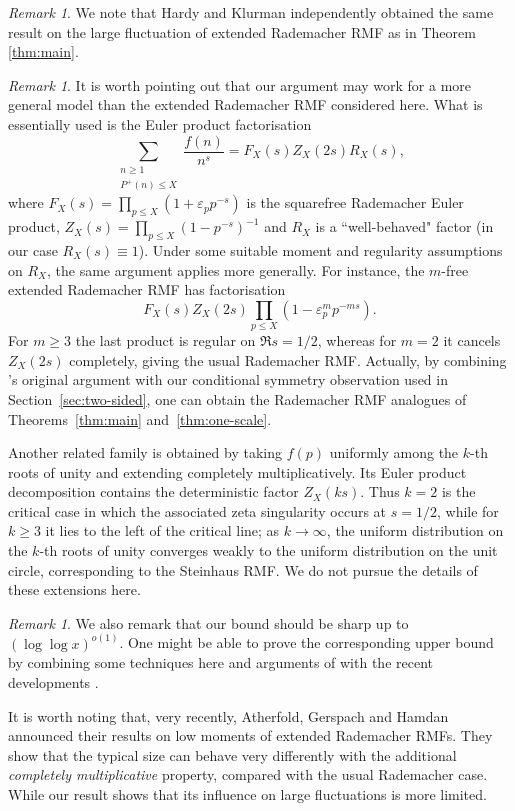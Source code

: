 \documentclass[a4paper,12pt,reqno]{amsart}
\numberwithin{equation}{section}
\theoremstyle{remark}
\newtheorem{remark}[theorem]{Remark}
\begin{document}
\begin{remark}
    We note that Hardy and Klurman \cite{HardyKlurman2026} independently obtained the same result on the large fluctuation of extended Rademacher RMF as in Theorem \ref{thm:main}.
\end{remark}

\begin{remark}
It is worth pointing out that our argument may work for a more general model than the extended Rademacher RMF considered here.  What is essentially used is the Euler product factorisation
\[
\sum_{\substack{n\geq1\\P^+(n)\leq X}}\frac{f(n)}{n^s}=F_X(s)Z_X(2s)R_X(s),
\]
where \(F_X(s)=\prod_{p\le X}(1+\varepsilon_p p^{-s})\) is the
squarefree Rademacher Euler product, $Z_X(s)=\prod_{p\leq X}(1-p^{-s})^{-1}$ and \(R_X\) is a ``well-behaved" 
factor (in our case $R_X(s)\equiv1$). 
Under some suitable moment and  regularity assumptions
on \(R_X\), the same argument  applies more generally. 
For instance, the \(m\)-free  extended 
Rademacher RMF has  factorisation
\[
 F_X(s)Z_X(2s)
 \prod_{p\le X}\left(1-\varepsilon_p^m p^{-ms}\right).
\]
For \(m\ge3\) the last product is regular on \(\Re s=1/2\), whereas for
\(m=2\) it cancels \(Z_X(2s)\) completely, giving the usual  Rademacher
RMF. Actually, by combining  \citet{Harper2023Large}'s original argument with our conditional symmetry
observation used in Section~\ref{sec:two-sided}, one can obtain the Rademacher RMF analogues
of Theorems~\ref{thm:main} and~\ref{thm:one-scale}. 

Another related family is obtained by taking \(f(p)\) uniformly among the
\(k\)-th roots of unity and extending completely multiplicatively. Its Euler product decomposition contains the deterministic factor
\(Z_X(ks)\).  Thus \(k=2\) is the critical case in which the associated
zeta singularity occurs at \(s=1/2\), while for \(k\ge3\) it lies to the
left of the critical line; as \(k\to\infty\),  the uniform distribution on the \(k\)-th roots of unity converges weakly to the uniform distribution on the unit circle, corresponding
to the Steinhaus RMF.  We do not pursue the details of these extensions here.
\end{remark}

\begin{remark}
    We also remark that our bound should be sharp up to $(\log \log x)^{o(1)}$. One might be able to prove the corresponding upper bound by combining some techniques here and arguments of \citet{Caich2023} with the recent developments \cite{DurkanPearceCrump2026,Verreault2026}. 

It is worth noting that, 
very recently, Atherfold, Gerspach and Hamdan
\cite{AtherfoldGerspachHamdan2026} announced their results on low moments of extended Rademacher RMFs.
They show that the typical size can behave very differently with the additional \textit{completely multiplicative} property, compared with the usual Rademacher case. While our result %
shows that its influence on large fluctuations is more limited.
\end{remark}
\end{document}
